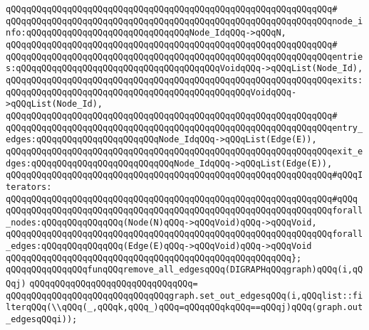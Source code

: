 \verb|qQQqqQQqqQQqqQQqqQQqqQQqqQQqqQQqqQQqqQQqqQQqqQQqqQQqqQQqqQQqqQQq#|\newline
\verb|qQQqqQQqqQQqqQQqqQQqqQQqqQQqqQQqqQQqqQQqqQQqqQQqqQQqqQQqqQQqqQQqnode_info:qQQqqQQqqQQqqQQqqQQqqQQqqQQqqQQqNode_IdqQQq->qQQqN,|\newline
\verb|qQQqqQQqqQQqqQQqqQQqqQQqqQQqqQQqqQQqqQQqqQQqqQQqqQQqqQQqqQQqqQQq#|\newline
\verb|qQQqqQQqqQQqqQQqqQQqqQQqqQQqqQQqqQQqqQQqqQQqqQQqqQQqqQQqqQQqqQQqentries:qQQqqQQqqQQqqQQqqQQqqQQqqQQqqQQqqQQqqQQqVoidqQQq->qQQqList(Node_Id),|\newline
\verb|qQQqqQQqqQQqqQQqqQQqqQQqqQQqqQQqqQQqqQQqqQQqqQQqqQQqqQQqqQQqqQQqexits:qQQqqQQqqQQqqQQqqQQqqQQqqQQqqQQqqQQqqQQqqQQqqQQqVoidqQQq->qQQqList(Node_Id),|\newline
\verb|qQQqqQQqqQQqqQQqqQQqqQQqqQQqqQQqqQQqqQQqqQQqqQQqqQQqqQQqqQQqqQQq#|\newline
\verb|qQQqqQQqqQQqqQQqqQQqqQQqqQQqqQQqqQQqqQQqqQQqqQQqqQQqqQQqqQQqqQQqentry_edges:qQQqqQQqqQQqqQQqqQQqqQQqNode_IdqQQq->qQQqList(Edge(E)),|\newline
\verb|qQQqqQQqqQQqqQQqqQQqqQQqqQQqqQQqqQQqqQQqqQQqqQQqqQQqqQQqqQQqqQQqexit_edges:qQQqqQQqqQQqqQQqqQQqqQQqqQQqNode_IdqQQq->qQQqList(Edge(E)),|\newline
\newline
\verb|qQQqqQQqqQQqqQQqqQQqqQQqqQQqqQQqqQQqqQQqqQQqqQQqqQQqqQQqqQQqqQQq#qQQqIterators:|\newline
\verb|qQQqqQQqqQQqqQQqqQQqqQQqqQQqqQQqqQQqqQQqqQQqqQQqqQQqqQQqqQQqqQQq#qQQq|\newline
\verb|qQQqqQQqqQQqqQQqqQQqqQQqqQQqqQQqqQQqqQQqqQQqqQQqqQQqqQQqqQQqqQQqforall_nodes:qQQqqQQqqQQqqQQq(Node(N)qQQq->qQQqVoid)qQQq->qQQqVoid,|\newline
\verb|qQQqqQQqqQQqqQQqqQQqqQQqqQQqqQQqqQQqqQQqqQQqqQQqqQQqqQQqqQQqqQQqforall_edges:qQQqqQQqqQQqqQQq(Edge(E)qQQq->qQQqVoid)qQQq->qQQqVoid|\newline
\verb|qQQqqQQqqQQqqQQqqQQqqQQqqQQqqQQqqQQqqQQqqQQqqQQqqQQqqQQq};|\newline
\newline
\newline
\verb|qQQqqQQqqQQqqQQqfunqQQqremove_all_edgesqQQq(DIGRAPHqQQqgraph)qQQq(i,qQQqj)|\newline
\verb|qQQqqQQqqQQqqQQqqQQqqQQqqQQqqQQq=|\newline
\verb|qQQqqQQqqQQqqQQqqQQqqQQqqQQqqQQqgraph.set_out_edgesqQQq(i,qQQqlist::filterqQQq(\\qQQq(_,qQQqk,qQQq_)qQQq=qQQqqQQqkqQQq==qQQqj)qQQq(graph.out_edgesqQQqi));|\newline
